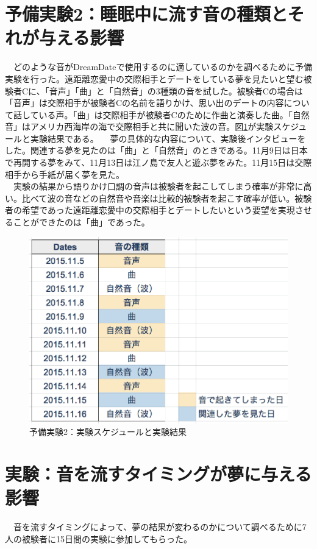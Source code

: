 \section{予備実験2：睡眠中に流す音の種類とそれが与える影響}
　どのような音がDreamDateで使用するのに適しているのかを調べるために予備実験を行った。遠距離恋愛中の交際相手とデートをしている夢を見たいと望む被験者Cに、「音声」「曲」と「自然音」の3種類の音を試した。被験者Cの場合は「音声」は交際相手が被験者Cの名前を語りかけ、思い出のデートの内容について話している声。「曲」は交際相手が被験者Cのために作曲と演奏した曲。「自然音」はアメリカ西海岸の海で交際相手と共に聞いた波の音。図\ref{experiment2}が実験スケジュールと実験結果である。
　夢の具体的な内容について、実験後インタビューをした。関連する夢を見たのは「曲」と「自然音」のときである。11月9日は日本で再開する夢をみて、11月13日は江ノ島で友人と遊ぶ夢をみた。11月15日は交際相手から手紙が届く夢を見た。\\
　実験の結果から語りかけ口調の音声は被験者を起こしてしまう確率が非常に高い。比べて波の音などの自然音や音楽は比較的被験者を起こす確率が低い。被験者の希望であった遠距離恋愛中の交際相手とデートしたいという要望を実現させることができたのは「曲」であった。

\begin{figure}[htbp]
\begin{center}
\includegraphics[width=13cm]{eps/schedule1.eps}
\caption{予備実験2：実験スケジュールと実験結果}
\label{experiment2}
\end{center}
\end{figure}

\section{実験：音を流すタイミングが夢に与える影響}
　音を流すタイミングによって、夢の結果が変わるのかについて調べるために7人の被験者に15日間の実験に参加してもらった。

